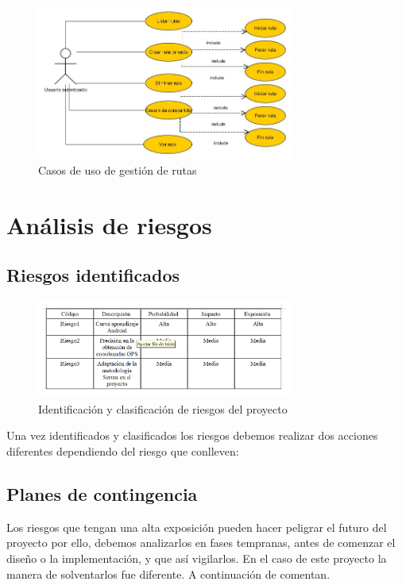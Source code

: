 \begin{figure}[H]
		\centering
		\includegraphics[width=0.75\textwidth] {rutas.jpg}
		\caption{Casos de uso de gestión de rutas }
	\end{figure}


\section{Análisis de riesgos}
\subsection{Riesgos identificados}
\begin{figure}[H]
		\centering
		\includegraphics[width=0.75\textwidth] {riesgos.png}
		\caption{Identificación y clasificación de riesgos del proyecto }
	\end{figure}
	
	
Una vez identificados y clasificados los riesgos debemos realizar dos acciones diferentes dependiendo del riesgo que conlleven:
\subsection{Planes de contingencia} 

Los riesgos que tengan una alta exposición pueden hacer peligrar el futuro del proyecto por ello,  debemos analizarlos en fases tempranas, antes
de comenzar el diseño o la implementación, y que así   vigilarlos. En el caso de este proyecto la manera de solventarlos fue diferente.  A continuación de comentan.

